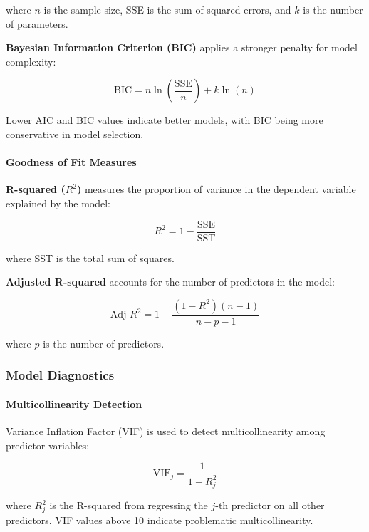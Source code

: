 where $n$ is the sample size, SSE is the sum of squared errors, and $k$ is the number of parameters.

\textbf{Bayesian Information Criterion (BIC)} applies a stronger penalty for model complexity:

\begin{equation}
\text{BIC} = n \ln\left(\frac{\text{SSE}}{n}\right) + k \ln(n)
\end{equation}

Lower AIC and BIC values indicate better models, with BIC being more conservative in model selection.

\paragraph{Goodness of Fit Measures}

\textbf{R-squared ($R^2$)} measures the proportion of variance in the dependent variable explained by the model:

\begin{equation}
R^2 = 1 - \frac{\text{SSE}}{\text{SST}}
\end{equation}

where SST is the total sum of squares.

\textbf{Adjusted R-squared} accounts for the number of predictors in the model:

\begin{equation}
\text{Adj } R^2 = 1 - \frac{(1-R^2)(n-1)}{n-p-1}
\end{equation}

where $p$ is the number of predictors.

\subsubsection{Model Diagnostics}

\paragraph{Multicollinearity Detection}

Variance Inflation Factor (VIF) is used to detect multicollinearity among predictor variables:

\begin{equation}
\text{VIF}_j = \frac{1}{1-R_j^2}
\end{equation}

where $R_j^2$ is the R-squared from regressing the $j$-th predictor on all other predictors. VIF values above 10 indicate problematic multicollinearity.

